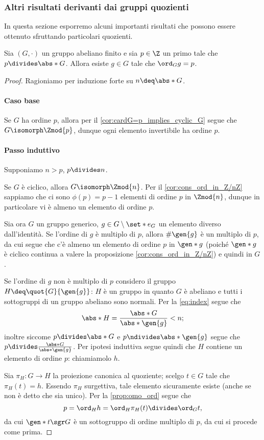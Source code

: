 \subsubsection{Altri risultati derivanti dai gruppi quozienti}
In questa sezione esporremo alcuni importanti risultati che possono essere ottenuto sfruttando particolari quozienti.

\begin{theorem}
    Sia $(G, \cdot)$ un gruppo abeliano finito e sia $p \in \Z$ un primo tale che $p \divides \abs*{G}$. 
    Allora esiste $g \in G$ tale che $\ord_{G}{g} = p$.
\end{theorem}
\begin{proof}
    Ragioniamo per induzione forte su $n \deq \abs*{G}$.
    \paragraph{Caso base}
    Se $G$ ha ordine $p$, allora per il \autoref{cor:cardG=p_implies_cyclic_G} segue che $G \isomorph \Zmod{p}$, dunque ogni elemento invertibile ha ordine $p$.

    \paragraph{Passo induttivo} Supponiamo $n > p$,  $p \divides n$.

    Se $G$ è ciclico, allora $G \isomorph \Zmod{n}$. Per il \autoref{cor:cons_ord_in_Z/nZ} sappiamo che ci sono $\phi(p) = p-1$ elementi di ordine $p$ in $\Zmod{n}$, dunque in particolare vi è almeno un elemento di ordine $p$.

    Sia ora $G$ un gruppo generico, $g \in G \setminus \set*{e_G}$ un elemento diverso dall'identità. 
    Se l'ordine di $g$ è multiplo di $p$, allora $\#\gen{g}$ è un multiplo di  $p$, da cui segue che c'è almeno un elemento di ordine $p$ in $\gen*{g}$ 
    (poiché $\gen*{g}$ è ciclico continua a valere la proposizione \autoref{cor:cons_ord_in_Z/nZ}) e quindi in $G$.

    Se l'ordine di $g$ non è multiplo di $p$ considero il gruppo $H \deq \quot{G}{\gen{g}}$: 
    $H$ è un gruppo in quanto $G$ è abeliano e tutti i sottogruppi di un gruppo abeliano sono normali. 
    Per la \eqref{eq:index} segue che \[
        \abs*{H} = \frac{\abs*{G}}{\abs*{\gen{g}}} < n;
    \] inoltre siccome $p \divides \abs*{G}$ e $p \ndivides \abs*{\gen{g}}$
    segue che $p \divides \frac{\abs*{G}}{\abs*{\gen{g}}}$. Per ipotesi induttiva segue quindi che $H$ contiene un elemento di ordine $p$: chiamiamolo $h$.

    Sia $\pi_H : G \to H$ la proiezione canonica al quoziente; scelgo $t \in G$ tale che $\pi_H(t) = h$.
    Essendo $\pi_H$ surgettiva, tale elemento sicuramente esiste (anche se non è detto che sia unico). Per la \autoref{prop:omo_ord} segue che  \[
        p = \ord_{H}{h} = \ord_{H}{\pi_H(t)} \divides \ord_{G}{t}, 
    \] da cui $\gen*{t} \sgr G$ è un sottogruppo di ordine multiplo di $p$, da cui si procede come prima.    
\end{proof}


